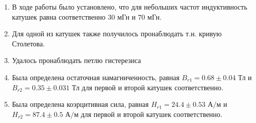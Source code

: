 \documentclass[a4paper, 12pt]{article}
\begin{document}
\begin{enumerate}
	\item В ходе работы было установлено, что для небольших частот индуктивность катушек равна соответственно $30$ мГн и $70$ мГн.
	
	\item  Для одной из катушек также получилось пронаблюдать т.н. кривую Столетова.
	
	\item Удалось пронаблюдать петлю гистерезиса
	
	\item Была определена остаточная намагниченность, равная $B_{r1} = 0.68 \pm 0.04$ Тл и $B_{r2} = 0.35 \pm 0.031$ Тл для первой и второй катушек соответственно.
	
	\item Была определена коэрцитивная сила, равная $H_{r1} = 24.4 \pm 0.53\text{ А/м} $ и $H_{r2} = 87.4 \pm 0.5\text{ А/м}$ для первой и второй катушек соответственно. 
\end{enumerate}
\end{document}
